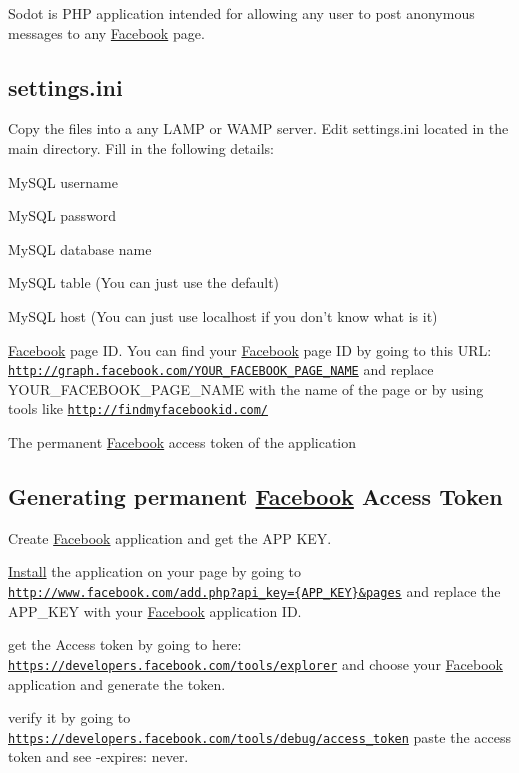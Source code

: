 Sodot is P\-H\-P application intended for allowing any user to post anonymous messages to any \hyperlink{classFacebook}{Facebook} page.

\subsection*{settings.\-ini}

Copy the files into a any L\-A\-M\-P or W\-A\-M\-P server. Edit settings.\-ini located in the main directory. Fill in the following details\-:
\begin{DoxyItemize}
\item My\-S\-Q\-L username
\item My\-S\-Q\-L password
\item My\-S\-Q\-L database name
\item My\-S\-Q\-L table (You can just use the default)
\item My\-S\-Q\-L host (You can just use localhost if you don't know what is it)
\item \hyperlink{classFacebook}{Facebook} page I\-D. You can find your \hyperlink{classFacebook}{Facebook} page I\-D by going to this U\-R\-L\-: \href{http://graph.facebook.com/YOUR_FACEBOOK_PAGE_NAME}{\tt http\-://graph.\-facebook.\-com/\-Y\-O\-U\-R\-\_\-\-F\-A\-C\-E\-B\-O\-O\-K\-\_\-\-P\-A\-G\-E\-\_\-\-N\-A\-M\-E} and replace Y\-O\-U\-R\-\_\-\-F\-A\-C\-E\-B\-O\-O\-K\-\_\-\-P\-A\-G\-E\-\_\-\-N\-A\-M\-E with the name of the page or by using tools like \href{http://findmyfacebookid.com/}{\tt http\-://findmyfacebookid.\-com/}
\item The permanent \hyperlink{classFacebook}{Facebook} access token of the application
\end{DoxyItemize}

\subsection*{Generating permanent \hyperlink{classFacebook}{Facebook} Access Token}


\begin{DoxyItemize}
\item Create \hyperlink{classFacebook}{Facebook} application and get the A\-P\-P K\-E\-Y.
\item \hyperlink{classInstall}{Install} the application on your page by going to \href{http://www.facebook.com/add.php?api_key={APP_KEY}&pages}{\tt http\-://www.\-facebook.\-com/add.\-php?api\-\_\-key=\{\-A\-P\-P\-\_\-\-K\-E\-Y\}\&pages} and replace the A\-P\-P\-\_\-\-K\-E\-Y with your \hyperlink{classFacebook}{Facebook} application I\-D.
\item get the Access token by going to here\-: \href{https://developers.facebook.com/tools/explorer}{\tt https\-://developers.\-facebook.\-com/tools/explorer} and choose your \hyperlink{classFacebook}{Facebook} application and generate the token.
\item verify it by going to \href{https://developers.facebook.com/tools/debug/access_token}{\tt https\-://developers.\-facebook.\-com/tools/debug/access\-\_\-token} paste the access token and see -\/expires\-: never.
\end{DoxyItemize}

